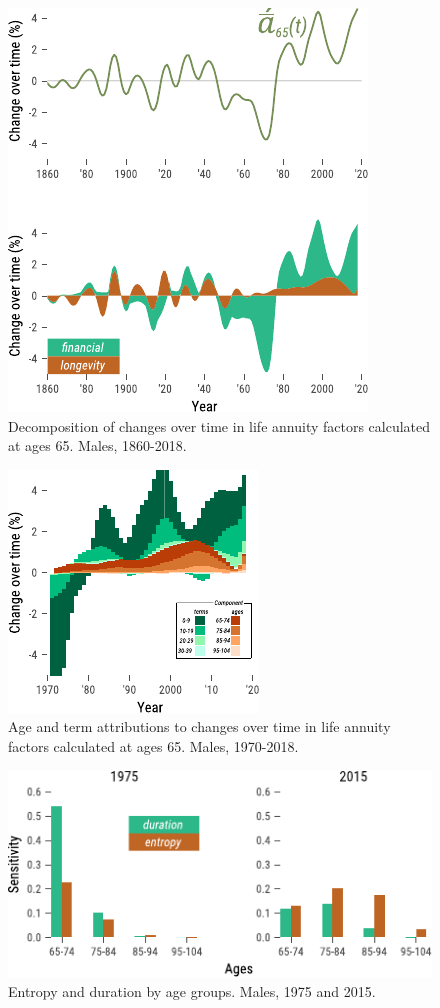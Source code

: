 \documentclass[12pt]{article}
\begin{document}
\begin{figure}[!ht]
	\centering
	\includegraphics[width=0.5\linewidth]{Fig/DescSingle}
	\caption{{Decomposition of changes over time in life annuity factors calculated at ages 65. Males, 1860-2018.}}
	\label{fig:Fig4}
\end{figure}



\begin{figure}[!ht]
	\centering
	\includegraphics[width=0.4\linewidth]{Fig/DescAge}
	\caption{{Age and term attributions to changes over time in life annuity factors calculated at ages 65. Males, 1970-2018.}}
	\label{fig:Fig5}
\end{figure}


\begin{figure}[!ht]
	\centering
	\includegraphics[width=0.7\linewidth]{Fig/AttributionDH}
	\caption{{Entropy and duration by age groups. Males, 1975 and 2015.}}
	\label{fig:Fig6}
\end{figure}
\end{document}

